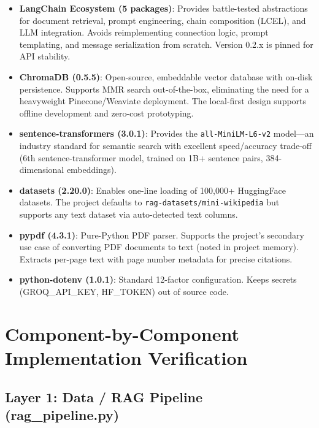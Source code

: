 \documentclass[12pt,a4paper]{article}
\begin{document}
\begin{itemize}[leftmargin=*]
    \item \textbf{LangChain Ecosystem (5 packages)}: Provides battle-tested abstractions for document retrieval, prompt engineering, chain composition (LCEL), and LLM integration. Avoids reimplementing connection logic, prompt templating, and message serialization from scratch. Version 0.2.x is pinned for API stability.
    
    \item \textbf{ChromaDB (0.5.5)}: Open-source, embeddable vector database with on-disk persistence. Supports MMR search out-of-the-box, eliminating the need for a heavyweight Pinecone/Weaviate deployment. The local-first design supports offline development and zero-cost prototyping.
    
    \item \textbf{sentence-transformers (3.0.1)}: Provides the \texttt{all-MiniLM-L6-v2} model—an industry standard for semantic search with excellent speed/accuracy trade-off (6th sentence-transformer model, trained on 1B+ sentence pairs, 384-dimensional embeddings).
    
    \item \textbf{datasets (2.20.0)}: Enables one-line loading of 100,000+ HuggingFace datasets. The project defaults to \texttt{rag-datasets/mini-wikipedia} but supports any text dataset via auto-detected text columns.
    
    \item \textbf{pypdf (4.3.1)}: Pure-Python PDF parser. Supports the project's secondary use case of converting PDF documents to text (noted in project memory). Extracts per-page text with page number metadata for precise citations.
    
    \item \textbf{python-dotenv (1.0.1)}: Standard 12-factor configuration. Keeps secrets (GROQ\_API\_KEY, HF\_TOKEN) out of source code.
\end{itemize}

\newpage

\section{Component-by-Component Implementation Verification}

\subsection{Layer 1: Data / RAG Pipeline (rag\_pipeline.py)}
\end{document}

